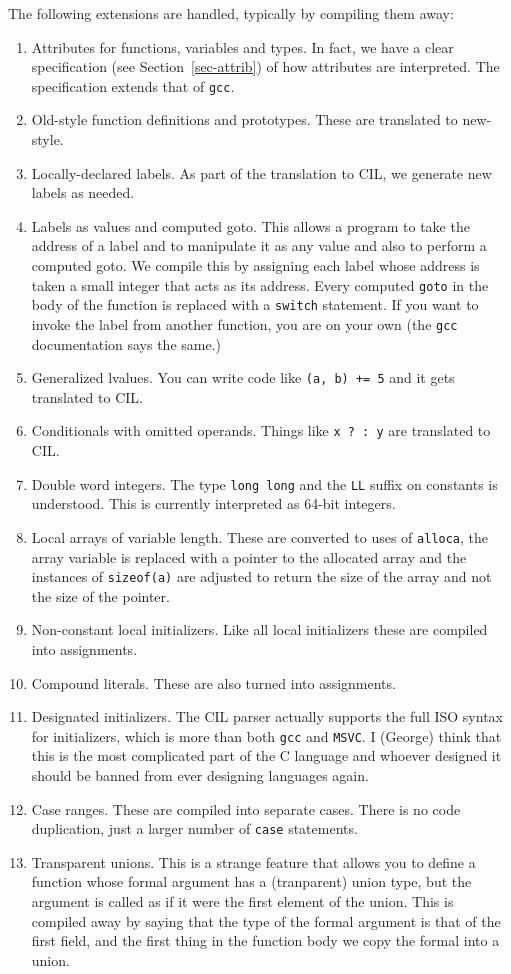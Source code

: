 \documentclass{article}
\def\secref#1{Section~\ref{sec-#1}}
\def\t#1{{\tt #1}}
\begin{document}
 The following extensions are handled, typically by compiling them away:
\begin{enumerate}
\item Attributes for functions, variables and types. In fact, we have a clear
specification (see \secref{attrib}) of how attributes are interpreted. The
specification extends that of \t{gcc}.
\item Old-style function definitions and prototypes. These are translated to
new-style. 
\item Locally-declared labels. As part of the translation to CIL, we generate
new labels as needed. 
\item Labels as values and computed goto. This allows a program to take the
address of a label and to manipulate it as any value and also to perform a
computed goto. We compile this by assigning each label whose address is taken
a small integer that acts as its address. Every computed \t{goto} in the body
of the function is replaced with a \t{switch} statement. If you want to invoke
the label from another function, you are on your own (the \t{gcc}
documentation says the same.)
\item Generalized lvalues. You can write code like \t{(a, b) += 5} and it gets
translated to CIL. 
\item Conditionals with omitted operands. Things like \t{x ? : y} are
translated to CIL.
\item Double word integers. The type \t{long long} and the \t{LL} suffix on
constants is understood. This is currently interpreted as 64-bit integers.
\item Local arrays of variable length. These are converted to uses of
\t{alloca}, the array variable is replaced with a pointer to the allocated
array and the instances of \t{sizeof(a)} are adjusted to return the size of
the array and not the size of the pointer. 
\item Non-constant local initializers. Like all local initializers these are
compiled into assignments. 
\item Compound literals. These are also turned into assignments.
\item Designated initializers. The CIL parser actually supports the full ISO
syntax for initializers, which is more than both \t{gcc} and \t{MSVC}. I
(George) think that this is the most complicated part of the C language and
whoever designed it should be banned from ever designing languages again.
\item Case ranges. These are compiled into separate cases. There is no code
duplication, just a larger number of \t{case} statements.
\item Transparent unions. This is a strange feature that allows you to define
a function whose formal argument has a (tranparent) union type, but the
argument is called as if it were the first element of the union. This is
compiled away by saying that the type of the formal argument is that of the
first field, and the first thing in the function body we copy the formal into
a union. 


\end{enumerate}
\end{document}
